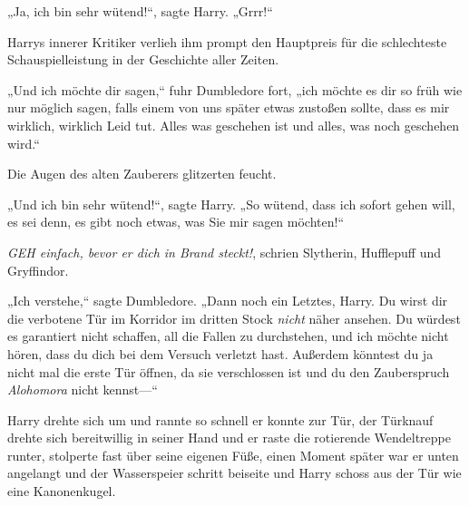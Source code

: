 „Ja, ich bin sehr wütend!“, sagte Harry. „Grrr!“

Harrys innerer Kritiker verlieh ihm prompt den Hauptpreis für die schlechteste Schauspielleistung in der Geschichte aller Zeiten.

„Und ich möchte dir sagen,“ fuhr Dumbledore fort, „ich möchte es dir so früh wie nur möglich sagen, falls einem von uns später etwas zustoßen sollte, dass es mir wirklich, wirklich Leid tut. Alles was geschehen ist und alles, was noch geschehen wird.“

Die Augen des alten Zauberers glitzerten feucht.

„Und ich bin sehr wütend!“, sagte Harry. „So wütend, dass ich sofort gehen will, es sei denn, es gibt noch etwas, was Sie mir sagen möchten!“

\emph{GEH einfach, bevor er dich in Brand steckt!}, schrien Slytherin, Hufflepuff und Gryffindor.

„Ich verstehe,“ sagte Dumbledore. „Dann noch ein Letztes, Harry. Du wirst dir die verbotene Tür im Korridor im dritten Stock \emph{nicht} näher ansehen. Du würdest es garantiert nicht schaffen, all die Fallen zu durchstehen, und ich möchte nicht hören, dass du dich bei dem Versuch verletzt hast. Außerdem könntest du ja nicht mal die erste Tür öffnen, da sie verschlossen ist und du den Zauberspruch \emph{Alohomora} nicht kennst—“

Harry drehte sich um und rannte so schnell er konnte zur Tür, der Türknauf drehte sich bereitwillig in seiner Hand und er raste die rotierende Wendeltreppe runter, stolperte fast über seine eigenen Füße, einen Moment später war er unten angelangt und der Wasserspeier schritt beiseite und Harry schoss aus der Tür wie eine Kanonenkugel.

